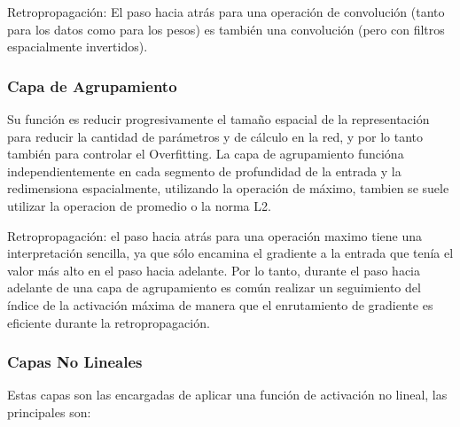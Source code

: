 \documentclass[a4paper,11pt,spanish]{book}
\begin{document}
	Retropropagación: El paso hacia atrás para una operación de convolución (tanto para los datos como para los pesos) es también una convolución (pero con filtros espacialmente invertidos).

      \subsubsection{Capa de Agrupamiento} 
	Su función es reducir progresivamente el tamaño espacial de la representación para reducir la cantidad de parámetros y de cálculo en la red, y por lo tanto también para controlar
	el Overfitting. La capa de agrupamiento funcióna independientemente en cada segmento de profundidad de la entrada y la redimensiona espacialmente, utilizando la operación de máximo, 
	tambien se suele utilizar la operacion de promedio o la norma L2.

	Retropropagación: el paso hacia atrás para una operación maximo tiene una interpretación sencilla, ya que sólo encamina el gradiente a la entrada que tenía el valor más alto
	en el paso hacia adelante. Por lo tanto, durante el paso hacia adelante de una capa de agrupamiento es común realizar un seguimiento del índice de la activación máxima de 
	manera que el enrutamiento de gradiente es eficiente durante la retropropagación.

      \subsubsection{Capas No Lineales}
	Estas capas son las encargadas de aplicar una función de activación no lineal, las principales son:
\end{document}
